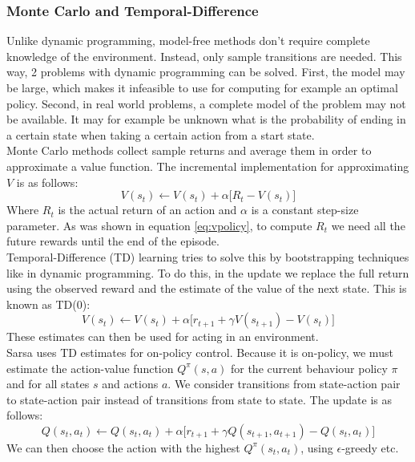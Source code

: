 \documentclass[a4paper]{article}
\begin{document}
\subsubsection{Monte Carlo and Temporal-Difference}
Unlike dynamic programming, model-free methods don't require complete knowledge of the environment. Instead, only sample transitions are needed. This way, 2 problems with dynamic programming can be solved. First, the model may be large, which makes it infeasible to use for computing for example an optimal policy. Second, in real world problems, a complete model of the problem may not be available. It may for example be unknown what is the probability of ending in a certain state when taking a certain action from a start state.\\
Monte Carlo methods collect sample returns and average them in order to approximate a value function. The incremental implementation for approximating $V$ is as follows:
\begin{equation}
V(s_t) \leftarrow V(s_t) + \alpha\big[R_t - V(s_t)\big]
\end{equation}
Where $R_t$ is the actual return of an action and $\alpha$ is a constant step-size parameter. As was shown in equation \ref{eq:vpolicy}, to compute $R_t$ we need all the future rewards until the end of the episode.\\
Temporal-Difference (TD) learning tries to solve this by bootstrapping techniques like in dynamic programming. To do this, in the update we replace the full return using the observed reward and the estimate of the value of the next state. This is known as TD(0): 
\begin{equation}
V(s_t) \leftarrow V(s_t) + \alpha\big[r_{t+1}+\gamma V(s_{t+1}) - V(s_t)\big]
\end{equation}
These estimates can then be used for acting in an environment.\\
Sarsa uses TD estimates for on-policy control. Because it is on-policy, we must estimate the action-value function $Q^\pi(s,a)$ for the current behaviour policy $\pi$ and for all states $s$ and actions $a$. We consider transitions from state-action pair to state-action pair instead of transitions from state to state. The update is as follows:
\begin{equation}
Q(s_t,a_t) \leftarrow Q(s_t,a_t) + \alpha \big[ r_{t+1} + \gamma Q(s_{t+1},a_{t+1}) - Q(s_t,a_t) \big]
\end{equation}
We can then choose the action with the highest $Q^\pi(s_t,a_t)$, using $\epsilon$-greedy etc.
\end{document}
